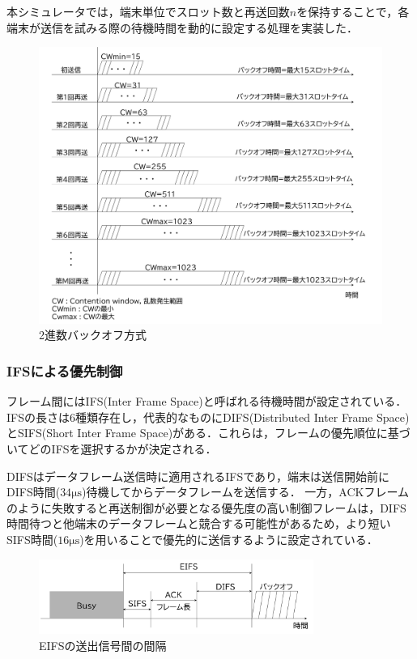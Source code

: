 \documentclass[a4paper,10pt]{ltjsarticle}
\begin{document}
本シミュレータでは，端末単位でスロット数と再送回数$n$を保持することで，各端末が送信を試みる際の待機時間を動的に設定する処理を実装した．

\begin{figure}[H]
  \centering
  \includegraphics[width=\textwidth]{./assets/CW_.png}
  \caption{2進数バックオフ方式}
  \label{binary-backoff}
\end{figure}


\clearpage
\subsubsection{IFSによる優先制御}

フレーム間にはIFS(Inter Frame Space)と呼ばれる待機時間が設定されている．IFSの長さは6種類存在し，代表的なものにDIFS(Distributed Inter Frame Space)とSIFS(Short Inter Frame Space)がある．これらは，フレームの優先順位に基づいてどのIFSを選択するかが決定される．

DIFSはデータフレーム送信時に適用されるIFSであり，端末は送信開始前にDIFS時間($34\mathrm{\mu s}$)待機してからデータフレームを送信する．
一方，ACKフレームのように失敗すると再送制御が必要となる優先度の高い制御フレームは，DIFS時間待つと他端末のデータフレームと競合する可能性があるため，より短いSIFS時間($16\mathrm{\mu s}$)を用いることで優先的に送信するように設定されている．

\begin{figure}[H]
  \centering
  \includegraphics[width=0.8\textwidth]{./assets/EIFS.png}
  \caption{EIFSの送出信号間の間隔}
  \label{eifs}
\end{figure}
\end{document}

